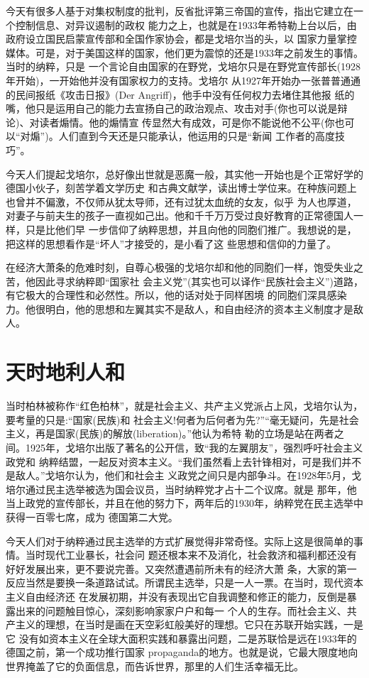 \documentclass[10pt]{article}
\begin{document}
{今天有很多人基于对集权制度的批判，反省批评第三帝国的宣传，指出它建立在一个控制信息、对异议遏制的政权
能力之上，也就是在1933年希特勒上台以后，由政府设立国民启蒙宣传部和全国作家协会，都是戈培尔当的头，以
国家力量掌控媒体。可是，对于美国这样的国家，他们更为震惊的还是1933年之前发生的事情。当时的纳粹，只是
一个言论自由国家的在野党，戈培尔只是在野党宣传部长(1928年开始)，一开始他并没有国家权力的支持。戈培尔
从1927年开始办一张普普通通的民间报纸\myrule 《攻击日报》(Der Angriff)，他手中没有任何权力去堵住其他报
纸的嘴，他只是运用自己的能力去宣扬自己的政治观点、攻击对手(你也可以说是辩论)、对读者煽情。他的煽情宣
传显然大有成效，可是你不能说他不公平(你也可以``对煽'')。人们直到今天还是只能承认，他运用的只是``新闻
工作者的高度技巧''。

今天人们提起戈培尔，总好像出世就是恶魔一般，其实他一开始也是个正常好学的德国小伙子，刻苦学着文学历史
和古典文献学，读出博士学位来。在种族问题上也曾并不偏激，不仅师从犹太导师，还有过犹太血统的女友，似乎
为人也厚道，对妻子与前夫生的孩子一直视如己出。他和千千万万受过良好教育的正常德国人一样，只是比他们早
一步信仰了纳粹思想，并且向他的同胞们推广。我想说的是，把这样的思想看作是``坏人''才接受的，是小看了这
些思想和信仰的力量了。

在经济大萧条的危难时刻，自尊心极强的戈培尔却和他的同胞们一样，饱受失业之苦，他因此寻求纳粹即``国家社
会主义党''(其实也可以译作``民族社会主义'')道路，有它极大的合理性和必然性。所以，他的话对处于同样困境
的同胞们深具感染力。他很明白，他的思想和左翼其实不是敌人，和自由经济的资本主义制度才是敌人。

\pagebreak
\section{天时地利人和}

当时柏林被称作``红色柏林''，就是社会主义、共产主义党派占上风，戈培尔认为，要考量的只是:``国家(民族)和
社会主义!何者为后何者为先?''``毫无疑问，先是社会主义，再是国家(民族)的解放(liberation)。''他认为希特
勒的立场是站在两者之间。1925年，戈培尔出版了著名的公开信，致``我的左翼朋友''，强烈呼吁社会主义政党和
纳粹结盟，一起反对资本主义。``我们虽然看上去针锋相对，可是我们并不是敌人。''戈培尔认为，他们和社会主
义政党之间只是内部争斗。在1928年5月，戈培尔通过民主选举被选为国会议员，当时纳粹党才占十二个议席。就是
那年，他当上政党的宣传部长，并且在他的努力下，两年后的1930年，纳粹党在民主选举中获得一百零七席，成为
德国第二大党。

今天人们对于纳粹通过民主选举的方式扩展觉得非常奇怪。实际上这是很简单的事情。当时现代工业暴长，社会问
题还根本来不及消化，社会救济和福利都还没有好好发展出来，更不要说完善。又突然遭遇前所未有的经济大萧
条，大家的第一反应当然是要换一条道路试试。所谓民主选举，只是一人一票。在当时，现代资本主义自由经济还
在发展初期，并没有表现出它自我调整和修正的能力，反倒是暴露出来的问题触目惊心，深刻影响家家户户和每一
个人的生存。而社会主义、共产主义的理想，在当时是画在天空彩虹般美好的理想。它只在苏联开始实践，一是它
没有如资本主义在全球大面积实践和暴露出问题，二是苏联恰是远在1933年的德国之前，第一个成功推行国家
propaganda的地方。也就是说，它最大限度地向世界掩盖了它的负面信息，而告诉世界，那里的人们生活幸福无比。

}
\end{document}
